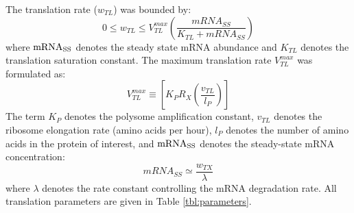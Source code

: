 \documentclass[journal=asbcd6,manuscript=article]{achemso}
\begin{document}
The translation rate ($w_{TL}$) was bounded by:
 \begin{equation}
	0\leq w_{TL} \leq V_{TL}^{max}\left(\frac{mRNA_{SS}}{K_{TL}+mRNA_{SS}}\right)
\end{equation}
where $\rm mRNA_{SS}$ denotes the steady state mRNA abundance and $K_{TL}$ denotes the translation saturation constant.
The maximum translation rate $V_{TL}^{max}$ was formulated as:
\begin{equation}
	V_{TL}^{max} \equiv \left[K_{P} R_{X}\left(\frac{v_{TL}}{l_{P}}\right)\right]
\end{equation}
The term $K_{P}$ denotes the polysome amplification constant,
$v_{TL}$ denotes the ribosome elongation rate (amino acids per hour),
$l_{P}$ denotes the number of amino acids in the protein of interest,
and $\rm mRNA_{SS}$ denotes the steady-state mRNA concentration:
\begin{equation}
	 mRNA_{SS}\simeq\frac{w_{TX}}{\lambda}
\end{equation}
where $\lambda$ denotes the rate constant controlling the mRNA degradation rate.
All translation parameters are given in Table \ref{tbl:parameters}.
\end{document}
